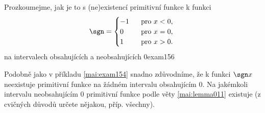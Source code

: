 \begin{mathexam}{Prozkoumejme, jak je to s (ne)existencí primitivní funkce k funkci
  \begin{equation*}
    \sgn = 
      \begin{cases}
         -1 & \text{pro} x<0, \\
          0 & \text{pro} x=0, \\
          1 & \text{pro} x>0.
      \end{cases}
  \end{equation*}
  na intervalech obsahujících a neobsahujících \(0\)}{exam156} 

  {\centering
    \captionsetup{type=figure} 
    \label{mai:fig079}
  \par}
  
  Podobně jako v příkladu \ref{mai:exam154} snadno zdůvodníme, že k funkci \(\sgn x\) neexistuje
  primitivní funkce na žádném intervalu obsahujícím \(0\). Na jakémkoli intervalu neobsahujícím
  \(0\) primitivní funkce podle věty \eqref{mai:lemma011} existuje (z cvičných důvodů určete
  nějakou, příp. všechny). 
\end{mathexam}